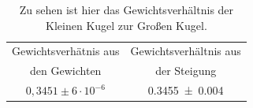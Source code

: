 \begin{table}[h]
	\caption{Zu sehen ist hier das Gewichtsverhältnis der Kleinen Kugel zur Großen Kugel.}
	\begin{tabular}{|c|c|}
		\hline
		Gewichtsverhätnis aus  & Gewichtsverhältnis aus\\
		 den Gewichten & der Steigung\\
		\hline
		$0,3451 \pm 6 \cdot 10^{-6}$& \SI{0,3455+-0,004}{}\\
		\hline
	\end{tabular}
	\label{tab:Gewicht}
\end{table}
